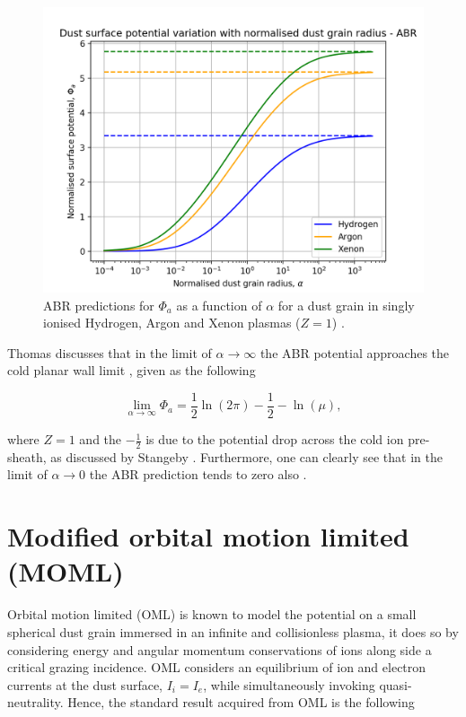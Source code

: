 \documentclass{article}
\begin{document}
\begin{figure}[H]
\centering
\includegraphics[width=\linewidth]{Output/ABRgraph.jpeg}
\caption{ABR predictions for $\Phi_a$ as a function of $\alpha$ for a dust grain in singly ionised Hydrogen, Argon and Xenon plasmas ($Z=1$) \cite{ABR} \cite{Thomas}.}
\label{ABR} 
\end{figure}

Thomas discusses that in the limit of $\alpha \to \infty$ the ABR potential approaches
the cold planar wall limit \cite{Thomas}, given as the following 

\begin{equation}\label{eq:ABRLim}
\lim_{\alpha \to \infty} \Phi_a = \frac{1}{2}\ln{\left(2 \pi \right)} - \frac{1}{2} - \ln{\left(\mu \right)},
\end{equation}

\smallskip

\noindent where $Z = 1$ and the $-\frac{1}{2}$ is due to the potential drop across the cold ion pre-sheath,
as discussed by Stangeby \cite{Stangeby1986} \cite{Stangeby2000}. Furthermore, one can clearly see that in the limit
of $\alpha \to 0$ the ABR prediction tends to zero also \cite{ABR}.

\section{Modified orbital motion limited (MOML)}

\smallskip

Orbital motion limited (OML) is known to model the potential on a small spherical
dust grain immersed in an infinite and collisionless plasma, it does so by considering
energy and angular momentum conservations of ions along side a critical grazing incidence.
OML considers an equilibrium of ion and electron currents at the dust 
surface, $I_i = I_e$, while simultaneously invoking quasi-neutrality.
Hence, the standard result acquired from OML is 
the following
\end{document}
